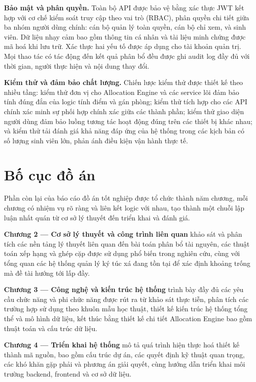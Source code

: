 \documentclass[a4paper,12pt,openany,oneside]{report}
\begin{document}
\textbf{Bảo mật và phân quyền.} Toàn bộ API được bảo vệ bằng xác thực JWT kết
hợp với cơ chế kiểm soát truy cập theo vai trò (RBAC), phân quyền chi tiết giữa
ba nhóm người dùng chính: cán bộ quản lý toàn quyền, cán bộ chỉ xem, và sinh
viên. Dữ liệu nhạy cảm bao gồm thông tin cá nhân và tài liệu minh chứng được
mã hoá khi lưu trữ. Xác thực hai yếu tố được áp dụng cho tài khoản quản trị.
Mọi thao tác có tác động đến kết quả phân bổ đều được ghi audit log đầy đủ với
thời gian, người thực hiện và nội dung thay đổi.

\textbf{Kiểm thử và đảm bảo chất lượng.} Chiến lược kiểm thử được thiết kế
theo nhiều tầng: kiểm thử đơn vị cho Allocation Engine và các service lõi đảm
bảo tính đúng đắn của logic tính điểm và gán phòng; kiểm thử tích hợp cho các
API chính xác minh sự phối hợp chính xác giữa các thành phần; kiểm thử giao
diện người dùng đảm bảo luồng tương tác hoạt động đúng trên các thiết bị khác
nhau; và kiểm thử tải đánh giá khả năng đáp ứng của hệ thống trong các kịch bản
có số lượng sinh viên lớn, phản ánh điều kiện vận hành thực tế.

\section{Bố cục đồ án}

Phần còn lại của báo cáo đồ án tốt nghiệp được tổ chức thành năm chương, mỗi
chương có nhiệm vụ rõ ràng và liên kết logic với nhau, tạo thành một chuỗi lập
luận nhất quán từ cơ sở lý thuyết đến triển khai và đánh giá.

\textbf{Chương 2 --- Cơ sở lý thuyết và công trình liên quan} khảo sát và phân
tích các nền tảng lý thuyết liên quan đến bài toán phân bổ tài nguyên, các
thuật toán xếp hạng và ghép cặp được sử dụng phổ biến trong nghiên cứu, cùng
với tổng quan các hệ thống quản lý ký túc xá đang tồn tại để xác định khoảng
trống mà đề tài hướng tới lấp đầy.

\textbf{Chương 3 --- Công nghệ và kiến trúc hệ thống} trình bày đầy đủ các yêu cầu chức năng và phi chức năng được rút ra từ khảo sát thực tiễn, phân
tích các trường hợp sử dụng theo khuôn mẫu học thuật, thiết kế kiến trúc hệ
thống tổng thể và mô hình dữ liệu, kết thúc bằng thiết kế chi tiết Allocation
Engine bao gồm thuật toán và cấu trúc dữ liệu.

\textbf{Chương 4 --- Triển khai hệ thống} mô tả quá trình hiện thực hoá thiết
kế thành mã nguồn, bao gồm cấu trúc dự án, các quyết định kỹ thuật quan trọng,
các khó khăn gặp phải và phương án giải quyết, cùng hướng dẫn triển khai môi
trường backend, frontend và cơ sở dữ liệu.
\end{document}
